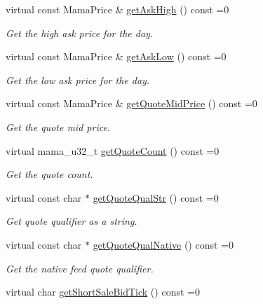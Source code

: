 \begin{CompactItemize}
virtual const Mama\-Price \& \hyperlink{classWombat_1_1MamdaQuoteRecap_d775066ddd925c5cfc3f736b6da9b3d8}{get\-Ask\-High} () const =0
\begin{CompactList}\small\item\em Get the high ask price for the day. \item\end{CompactList}\item 
virtual const Mama\-Price \& \hyperlink{classWombat_1_1MamdaQuoteRecap_0d1047a74037b9bf740e1ac49e602ae2}{get\-Ask\-Low} () const =0
\begin{CompactList}\small\item\em Get the low ask price for the day. \item\end{CompactList}\item 
virtual const Mama\-Price \& \hyperlink{classWombat_1_1MamdaQuoteRecap_5db663146079f9fd6127cd8f6ed05515}{get\-Quote\-Mid\-Price} () const =0
\begin{CompactList}\small\item\em Get the quote mid price. \item\end{CompactList}\item 
virtual mama\_\-u32\_\-t \hyperlink{classWombat_1_1MamdaQuoteRecap_538b0e423e2ecf6b4be494bfc07186eb}{get\-Quote\-Count} () const =0
\begin{CompactList}\small\item\em Get the quote count. \item\end{CompactList}\item 
virtual const char $\ast$ \hyperlink{classWombat_1_1MamdaQuoteRecap_fb02eb53de95ff3bd9755f3e6a179db6}{get\-Quote\-Qual\-Str} () const =0
\begin{CompactList}\small\item\em Get quote qualifier as a string. \item\end{CompactList}\item 
virtual const char $\ast$ \hyperlink{classWombat_1_1MamdaQuoteRecap_79543d52d9809abd98abfce3fe4e29e9}{get\-Quote\-Qual\-Native} () const =0
\begin{CompactList}\small\item\em Get the native feed quote qualifier. \item\end{CompactList}\item 
virtual char \hyperlink{classWombat_1_1MamdaQuoteRecap_350d0a476aaaa5bec2a007b5de79f7ff}{get\-Short\-Sale\-Bid\-Tick} () const =0

\end{CompactItemize}
